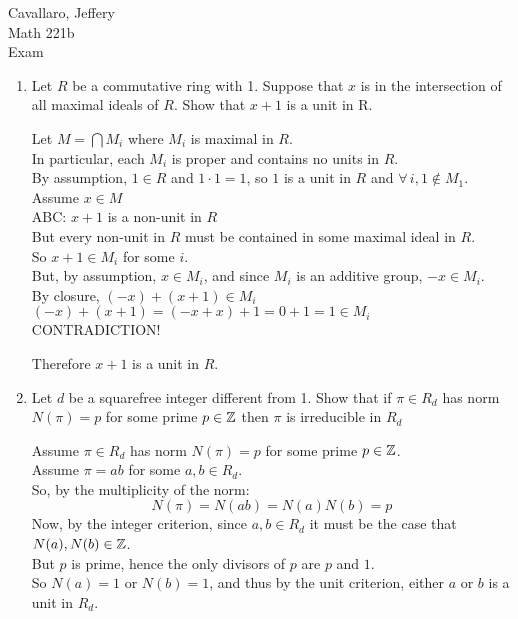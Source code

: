 \documentclass[letterpaper,12pt,fleqn]{article}
\begin{document}
Cavallaro, Jeffery \\
Math 221b \\
Exam

\bigskip

\begin{enumerate}
\item Let $R$ be a commutative ring with 1. Suppose that $x$ is in the
  intersection of all maximal ideals of $R$. Show that $x+1$ is a unit in R.

  \bigskip

  Let $M=\bigcap M_i$ where $M_i$ is maximal in $R$. \\
  In particular, each $M_i$ is proper and contains no units in $R$. \\
  By assumption, $1\in R$ and $1\cdot1=1$, so $1$ is a unit in $R$ and
  $\forall\,i,1\notin M_1$. \\
  Assume $x\in M$ \\
  ABC: $x+1$ is a non-unit in $R$ \\
  But every non-unit in $R$ must be contained in some maximal ideal in $R$. \\
  So $x+1\in M_i$ for some $i$. \\
  But, by assumption, $x\in M_i$, and since $M_i$ is an additive group, $-x\in M_i$. \\
  By closure, $(-x)+(x+1)\in M_i$ \\
  $(-x)+(x+1)=(-x+x)+1=0+1=1\in M_i$ \\
  CONTRADICTION!

  Therefore $x+1$ is a unit in $R$.

  \bigskip
  
\item Let $d$ be a squarefree integer different from 1. Show that if
  $\pi\in R_d$ has norm $N(\pi)=p$ for some prime $p\in\mathbb{Z}$ then $\pi$ is
  irreducible in $R_d$

  \bigskip

  Assume $\pi\in R_d$ has norm $N(\pi)=p$ for some prime $p\in\mathbb{Z}$. \\
  Assume $\pi=ab$ for some $a,b\in R_d$. \\
  So, by the multiplicity of the norm:
  \[N(\pi)=N(ab)=N(a)N(b)=p\]
  Now, by the integer criterion, since $a,b\in R_d$ it must be the case that
  $N(a),N(b)\in\mathbb{Z}$. \\
  But $p$ is prime, hence the only divisors of $p$ are $p$ and $1$. \\
  So $N(a)=1$ or $N(b)=1$, and thus by the unit criterion, either $a$ or $b$ is
  a unit in $R_d$.


\end{enumerate}
\end{document}
